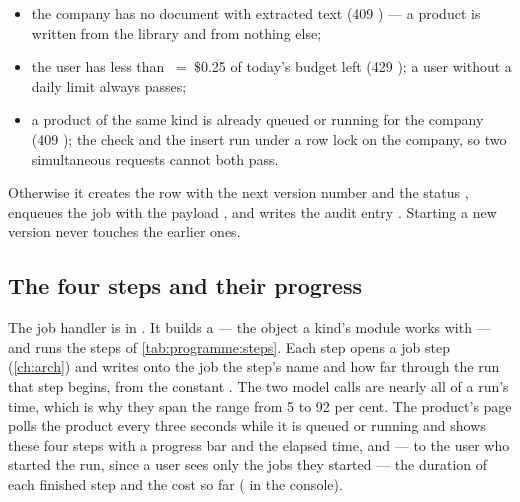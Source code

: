 \begin{itemize}
  \item the company has no document with extracted text (409 ) --- a
        product is written from the library and from nothing else;
  \item the user has less than ~=~\$0.25 of today's budget
        left (429 ); a user without a daily limit always passes;
  \item a product of the same kind is already queued or running for the company (409
        ); the check and the insert run under a row lock on the
        company, so two simultaneous requests cannot both pass.
\end{itemize}

Otherwise it creates the row with the next version number and the status ,
enqueues the job with the payload , and writes the audit entry
. Starting a new version never touches the earlier ones.

\subsection{The four steps and their progress}

The job handler is  in . It builds a  --- the
object a kind's module works with --- and runs the steps of \cref{tab:programme:steps}. Each
step opens a job step (\cref{ch:arch}) and writes onto the job the step's name and how far
through the run that step begins, from the constant . The two
model calls are nearly all of a run's time, which is why they span the range from 5 to 92 per
cent. The product's page polls the product every three seconds while it is queued or running
and shows these four steps with a progress bar and the elapsed time, and --- to the user who
started the run, since a user sees only the jobs they started --- the duration of each finished
step and the cost so far ( in the console).

